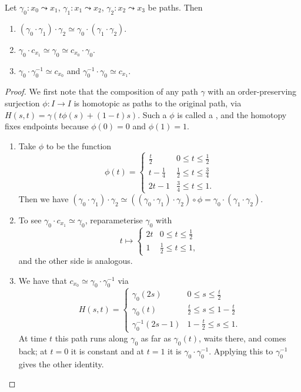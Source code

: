\documentclass[a4paper]{scrartcl}
\begin{document}
\begin{lemma} \label{lem:group-op}
	Let $\gamma_0: x_0 \leadsto x_1$, $\gamma_1: x_1 \leadsto x_2$, $\gamma_2: x_2 \leadsto x_3$ be paths.
	Then
	\begin{enumerate}
		\item $(\gamma_0 \cdot \gamma_1) \cdot \gamma_2 \simeq \gamma_0 \cdot (\gamma_1 \cdot \gamma_2)$.
		\item $\gamma_0 \cdot c_{x_1} \simeq \gamma_0 \simeq c_{x_0} \cdot \gamma_0$.
		\item $\gamma_0 \cdot \gamma_0^{-1} \simeq c_{x_0}$ and $\gamma_0^{-1} \cdot \gamma_0 \simeq c_{x_1}$.
	\end{enumerate}
\end{lemma}
\begin{proof}
	We first note that the composition of any path $\gamma$ with an order-preserving surjection $\phi: I \rightarrow I$ is homotopic as paths to the original path, via $H(s, t) = \gamma(t\phi(s) + (1 - t)s)$. Such a $\phi$ is called a , and the homotopy fixes endpoints because $\phi(0) = 0$ and $\phi(1) = 1$.
	\begin{enumerate}
		\item Take $\phi$ to be the function
		$$
		\phi(t)=\begin{cases}
			\frac{t}{2} & 0 \leq t \leq \frac{1}{2} \\
			t - \frac{1}{4} & \frac{1}{2} \leq t \leq \frac{3}{4} \\
			2t - 1 & \frac{3}{4} \leq t \leq 1.
		\end{cases}
		$$
		Then we have $(\gamma_0 \cdot \gamma_1) \cdot \gamma_2 \simeq ((\gamma_0 \cdot \gamma_1) \cdot \gamma_2) \circ \phi = \gamma_0 \cdot (\gamma_1 \cdot \gamma_2)$.
		\item To see $\gamma_0 \cdot c_{x_1} \simeq \gamma_0$, reparameterise $\gamma_0$ with
		$$
		t \mapsto \begin{cases}
			2t & 0 \leq t \leq \frac{1}{2} \\
			1 & \frac{1}{2} \leq t \leq 1,
		\end{cases}
		$$
		and the other side is analogous.
		\item We have that $c_{x_0} \simeq \gamma_0 \cdot \gamma_0^{-1}$ via
		$$
		H(s, t) = \begin{cases}
			\gamma_0(2s) & 0 \leq s \leq \frac{t}{2} \\
			\gamma_0(t) & \frac{t}{2} \leq s \leq 1 - \frac{t}{2} \\
			\gamma_0^{-1}(2s - 1) & 1 - \frac{t}{2} \leq s \leq 1.
		\end{cases}
		$$
		At time $t$ this path runs along $\gamma_0$ as far as $\gamma_0(t)$, waits there, and comes back; at $t = 0$ it is constant and at $t=1$ it is $\gamma_0 \cdot \gamma_0^{-1}$. Applying this to $\gamma_0^{-1}$ gives the other identity. \qedhere
	\end{enumerate}
\end{proof}
\end{document}
